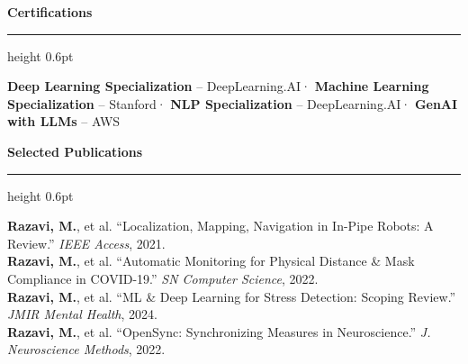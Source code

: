 \documentclass[11pt,letterpaper]{article}
\newcommand{\cvsection}[1]{%
  \vspace{0.2em}%
  {\color{headerblue}\large\bfseries #1}%
  \vspace{0.08em}%
  {\color{goldaccent}\hrule height 0.6pt}%
  \vspace{0.2em}%
}
\begin{document}
\cvsection{Certifications}

{\color{darktext}
\textbf{Deep Learning Specialization} {\color{lightgray}-- DeepLearning.AI}\enspace·\enspace
\textbf{Machine Learning Specialization} {\color{lightgray}-- Stanford}\enspace·\enspace
\textbf{NLP Specialization} {\color{lightgray}-- DeepLearning.AI}\enspace·\enspace
\textbf{GenAI with LLMs} {\color{lightgray}-- AWS}
}

\cvsection{Selected Publications}

{\color{darktext}
\textbf{Razavi, M.}, et al. ``Localization, Mapping, Navigation in In-Pipe Robots: A Review.'' \textit{IEEE Access}, 2021.\\[0.05em]
\textbf{Razavi, M.}, et al. ``Automatic Monitoring for Physical Distance \& Mask Compliance in COVID-19.'' \textit{SN Computer Science}, 2022.\\[0.05em]
\textbf{Razavi, M.}, et al. ``ML \& Deep Learning for Stress Detection: Scoping Review.'' \textit{JMIR Mental Health}, 2024.\\[0.05em]
\textbf{Razavi, M.}, et al. ``OpenSync: Synchronizing Measures in Neuroscience.'' \textit{J. Neuroscience Methods}, 2022.
}
\end{document}
